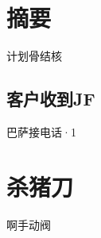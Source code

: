 \documentclass{HNUThesis}
\begin{document}
\makeconsent

\newpage
\tableofcontents

\newpage

\section{摘要}
计划骨结核
\subsection{客户收到JF}
巴萨接电话·1
\section{杀猪刀}
啊手动阀
\end{document}
